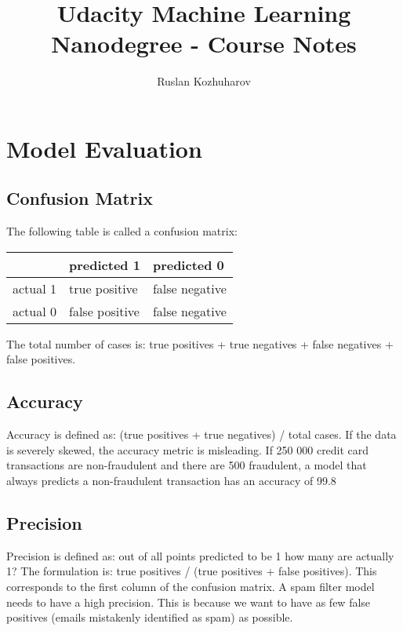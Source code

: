\documentclass{article}
\title{Udacity Machine Learning Nanodegree - Course Notes}
\author{Ruslan Kozhuharov}
\begin{document}
\maketitle
\tableofcontents
\newpage
{}
\setlength{\parskip}{1em}

\section{Model Evaluation}
\subsection{Confusion Matrix}
The following table is called a confusion matrix:

\begin{center}
\begin{tabular}{ |l|l|l| }
  \hline
   & predicted 1 & predicted 0 \\
  \hline
  actual 1 & true positive & false negative \\
  actual 0 & false positive & false negative \\
  \hline
\end{tabular}
\end{center}

The total number of cases is: true positives + true negatives + false negatives + false positives.

\subsection{Accuracy}
Accuracy is defined as: (true positives + true negatives) / total cases.
If the data is severely skewed, the accuracy metric is misleading. If 250 000 credit card transactions are non-fraudulent and there are 500 fraudulent, a model that always predicts a non-fraudulent transaction has an accuracy of 99.8%

\subsection{Precision}
Precision is defined as: out of all points predicted to be 1 how many are actually 1? The formulation is: true positives / (true positives + false positives). This corresponds to the first column of the confusion matrix. A spam filter model needs to have a high precision. This is because we want to have as few false positives (emails mistakenly identified as spam) as possible.
\end{document}
